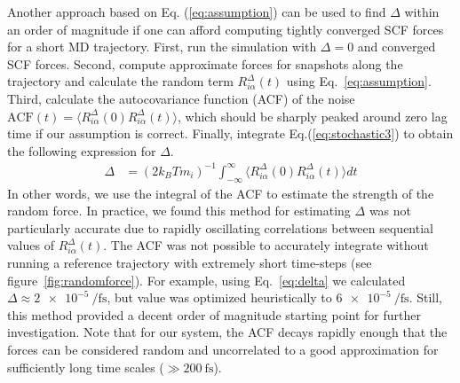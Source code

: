 \documentclass[aps,prl,reprint,amsmath,amssymb]{revtex4-1}
\begin{document}
Another approach based on Eq. (\ref{eq:assumption}) can be used to find $\Delta$ within an order of magnitude if one can afford computing tightly converged SCF forces for a short MD trajectory. 
First, run the simulation with $\Delta = 0$ and converged SCF forces. 
Second, compute approximate forces for snapshots along the trajectory and calculate the random term $R^{\Delta}_{i\alpha} (t)$ using Eq.\ \ref{eq:assumption}. 
Third, calculate the autocovariance function (ACF) of the noise $\text{ACF}(t) = \langle R^{\Delta}_{i\alpha} (0)  R^{\Delta}_{i\alpha} (t) \rangle$, which should be sharply peaked around zero lag time if our assumption is correct. 
Finally, integrate Eq.(\ref{eq:stochastic3}) to obtain the following expression for $\Delta$.
%
\begin{align}
\label{eq:delta}
\Delta &= (2 k_B T m_i )^{-1} \int_{-\infty}^{\infty}\langle R^{\Delta}_{i\alpha} (0)  R^{\Delta}_{i\alpha} (t) \rangle dt
\end{align}
%
In other words, we use the integral of the ACF to estimate the strength of the random force. 
In practice, we found this method for estimating $\Delta$ was not particularly accurate due to rapidly oscillating correlations between sequential values of $R^{\Delta}_{i\alpha} (t)$. 
The ACF was not possible to accurately integrate without running a reference trajectory with extremely short time-steps (see figure~\ref{fig:randomforce}).
For example, using Eq.\ \ref{eq:delta} we calculated $\Delta \approx \SI{2e-5}{\per\fs}$, but value was optimized heuristically to $\SI{6e-5}{\per\fs}$.
Still, this method provided a decent order of magnitude starting point for further investigation.
Note that for our system, the ACF decays rapidly enough that the forces can be considered random and uncorrelated to a good approximation for sufficiently long time scales ($\gg\SI{200}{\fs}$).
\end{document}
